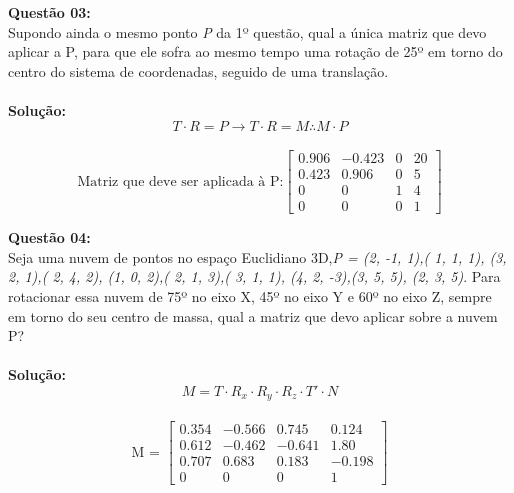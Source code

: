 \documentclass[10pt]{article}
\begin{document}
\vspace{1 cm}
\noindent\textbf{Questão 03:}\\
Supondo ainda o mesmo ponto \emph{P} da 1º questão, qual a única matriz que devo aplicar a P, para que ele sofra ao mesmo tempo uma rotação de 25º em torno do centro do sistema de coordenadas, seguido de uma translação.\\
\\
\noindent\textbf{Solução:}
\\
$$ T \cdot R = P \rightarrow T \cdot R = M \therefore M \cdot P $$
\\
\[
\text{Matriz que deve ser aplicada à P:}
	\begin{bmatrix}
        0.906 & -0.423 & 0 & 20\\
        0.423 & 0.906 & 0 & 5\\
        0 & 0 & 1 & 4\\
        0 & 0 & 0 & 1
    \end{bmatrix}
\]

\vspace{1cm}
\noindent\textbf{Questão 04:}\\
Seja uma nuvem de pontos no espaço Euclidiano 3D,\emph{P = (2, -1, 1),( 1, 1, 1), (3, 2, 1),( 2, 4, 2),
(1, 0, 2),( 2, 1, 3),( 3, 1, 1), (4, 2, -3),(3, 5, 5), (2, 3, 5)}. Para rotacionar essa nuvem de 75º no eixo X, 45º no eixo Y e 60º no eixo Z, sempre em torno do seu centro de massa, qual a matriz que devo aplicar sobre a nuvem P?\\
\\
\noindent\textbf{Solução:}
\\
$$ M =  T \cdot R_x \cdot R_y \cdot R_z \cdot T' \cdot N$$
\\
\[
\text{M = }
	\begin{bmatrix}
	    0.354 & -0.566 & 0.745 & 0.124\\
        0.612 & -0.462 & -0.641 & 1.80\\
        0.707 &  0.683 & 0.183 & -0.198\\
        0 & 0 & 0 & 1
    \end{bmatrix}
\]
\end{document}
